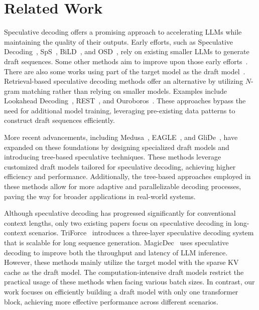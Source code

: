 \vspace{-.3cm}
\section{Related Work}
\vspace{-.1cm}

Speculative decoding offers a promising approach to accelerating LLMs while maintaining the quality of their outputs. Early efforts, such as Speculative Decoding~\cite{xia2023speculative}, SpS~\cite{leviathan2023fast}, BiLD~\cite{kim2024speculative}, and OSD~\cite{liu2024online}, rely on existing smaller LLMs to generate draft sequences. Some other methods aim to improve upon those early efforts~\cite{sun2023spectr, miao2024specinfer, chen2024cascade}. There are also some works using part of the target model as the draft model~\cite{liu2024kangaroo, zhang2024draft, elhoushi2024layerskip}. Retrieval-based speculative decoding methods offer an alternative by utilizing $N$-gram matching rather than relying on smaller models. Examples include Lookahead Decoding~\cite{fu2024break}, REST~\cite{he2024rest}, and Ouroboros~\cite{zhao2024ouroboros}. These approaches bypass the need for additional model training, leveraging pre-existing data patterns to construct draft sequences efficiently.

More recent advancements, including Medusa~\cite{cai2024medusa}, EAGLE~\cite{li2024eagle}, and GliDe~\cite{du2024glide}, have expanded on these foundations by designing specialized draft models and introducing tree-based speculative techniques. These methods leverage customized draft models tailored for speculative decoding, achieving higher efficiency and performance. Additionally, the tree-based approaches employed in these methods allow for more adaptive and parallelizable decoding processes, paving the way for broader applications in real-world systems.

Although speculative decoding has progressed significantly for conventional context lengths, only two existing papers focus on speculative decoding in long-context scenarios. TriForce~\cite{sun2024triforce} introduces a three-layer speculative decoding system that is scalable for long sequence generation. MagicDec~\cite{chen2024magicdec} uses speculative decoding to improve both the throughput and latency of LLM inference. However, these methods mainly utilize the target model with the sparse KV cache as the draft model. The computation-intensive draft models restrict the practical usage of these methods when facing various batch sizes. In contrast, our work focuses on efficiently building a draft model with only one transformer block, achieving more effective performance across different scenarios. 
